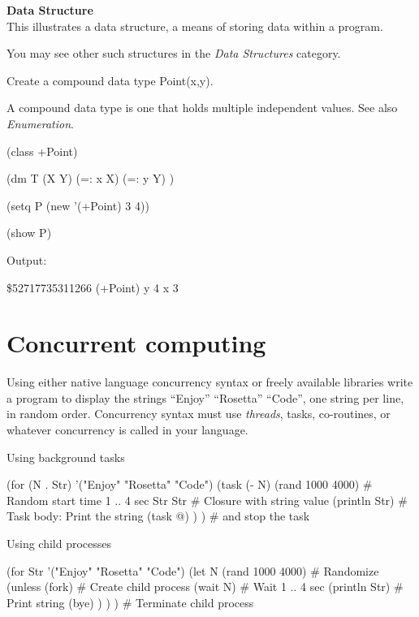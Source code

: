 \textbf{Data Structure}\\ This illustrates a data structure, a means of
storing data within a program.

You may see other such structures in the \emph{Data Structures}
category.

Create a compound data type Point(x,y).

A compound data type is one that holds multiple independent values.
See also \emph{Enumeration}.



\begin{wideverbatim}

(class +Point)

(dm T (X Y)
   (=: x X)
   (=: y Y) )

(setq P (new '(+Point) 3 4))

(show P)

Output:

\$52717735311266 (+Point)
   y 4
   x 3

\end{wideverbatim}

\pagebreak{}
\section*{Concurrent computing}

Using either native language concurrency syntax or freely available
libraries write a program to display the strings ``Enjoy'' ``Rosetta''
``Code'', one string per line, in random order. Concurrency syntax
must use \emph{threads}, tasks, co-routines, or whatever concurrency
is called in your language.

\begin{wideverbatim}

Using background tasks

(for (N . Str) '("Enjoy" "Rosetta" "Code")
   (task (- N) (rand 1000 4000)              # Random start time 1 .. 4 sec
      Str Str                                # Closure with string value
      (println Str)                          # Task body: Print the string
      (task @) ) )                           # and stop the task

Using child processes

(for Str '("Enjoy" "Rosetta" "Code")
   (let N (rand 1000 4000)                   # Randomize
      (unless (fork)                         # Create child process
         (wait N)                            # Wait 1 .. 4 sec
         (println Str)                       # Print string
         (bye) ) ) )                         # Terminate child process

\end{wideverbatim}

